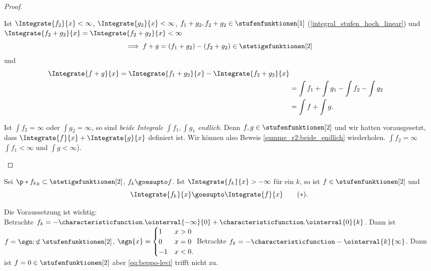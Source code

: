 \begin{proof}
\begin{proofdescription}
\begin{eigenschaftenenumerate}[ref=\rechtsklammer{\alph*}]
      \item \label{summe_r2:beide_endlich} Ist \( \Integrate{f_2}{x}<\infty \), \( \Integrate{g_2}{x}<\infty \), \( f_1+g_2, f_2+g_2\in \stufenfunktionen[1] \) (\ref{integral_stufen_hoch_linear})  und \( \Integrate{f_2+g_2}{x}=\Integrate{f_2+g_2}{x}<\infty \)
      \begin{equation*}
        \implies f+g=(f_1+g_2)-(f_2+g_2)\in \stetigefunktionen[2]
      \end{equation*}
      und 
      \begin{align*}
        \Integrate{f+g}{x}=\Integrate{f_1+g_2}{x}-\Integrate{f_2+g_2}{x}\\
        &=\int f_1+\int g_1-\int f_2-\int g_2\\
        &=\int f+\int g.
      \end{align*}
      \item Ist \( \int f_2=\infty \) oder \( \int g_2=\infty \), so sind \emph{beide Integrale \( \int f_1,\int g_1 \) endlich}. Denn \( f,g\in \stufenfunktionen[2] \) und wir hatten vorausgesetzt, dass \( \Integrate{f}{x}+\Integrate{g}{x} \) definiert ist. Wir können also Beweis \ref{summe_r2:beide_endlich} wiederholen. \(\int f_2=\infty\) \timplies \( \int f_1<\infty \) und \( \int g <\infty \)).
    \end{eigenschaftenenumerate}
  \end{proofdescription}
  
\end{proof}
\begin{satz} \label{beppo-levi}
  Sei \( \p*{f_k}_k\subset \stetigefunktionen[2] \), \( f_k\goesupto f \). Ist \( \Integrate{f_k}{x}>-\infty \) für ein \( k \), so ist \( f\in \stufenfunktionen[2] \) und 
  \begin{equation*}
    \label{eq:beppo-levi} \Integrate{f_k}{x}\goesupto \Integrate{f}{x}\tag{\( * \)}.
  \end{equation*}
\end{satz}
\begin{bemerkung*}
  Die Voraussetzung ist wichtig:\\
  Betrachte \( f_k=-\characteristicfunction.{\ointerval{-\infty}{0}}{}+\characteristicfunction.{\ointerval{0}{k}}{} \). Dann ist \( f=\sgn;\not\in \stufenfunktionen[2] \), \( \sgn{x}=\begin{cases}
    1&x>0\\ 0&x=0\\ -1&x<0.
  \end{cases} \)
  Betrachte \( f_k=-\characteristicfunction-{\ointerval{k}{\infty}}{} \). Dann ist \( f=0\in \stufenfunktionen[2] \) aber \eqref{eq:beppo-levi} trifft nicht zu.
\end{bemerkung*}
